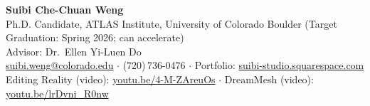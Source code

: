 \documentclass[11pt]{letter}
\begin{document}
\begin{flushleft}
\textbf{Suibi Che-Chuan Weng}\\
Ph.D. Candidate, ATLAS Institute, University of Colorado Boulder (Target Graduation: Spring 2026; can accelerate)\\
Advisor: Dr.\ Ellen Yi-Luen Do\\
\href{mailto:suibi.weng@colorado.edu}{suibi.weng@colorado.edu} \quad $\cdot$ \quad (720)\,736-0476 \quad $\cdot$ \quad Portfolio: \href{https://suibi-studio.squarespace.com}{suibi-studio.squarespace.com}\\
Editing Reality (video): \href{https://youtu.be/4-M-ZAreuOs}{youtu.be/4-M-ZAreuOs} \quad $\cdot$ \quad DreamMesh (video): \href{https://youtu.be/lrDvni_R0nw}{youtu.be/lrDvni_R0nw}
\end{flushleft}

\vspace{0.75em}
\end{document}
